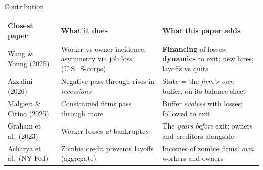 \documentclass[aspectratio=169,11pt]{beamer}
\newcommand{\hl}[1]{{\color{WarmAmber}\bfseries #1}}
\begin{document}
\begin{frame}{Contribution}
  \small
  \renewcommand{\arraystretch}{1.25}
  \begin{tabularx}{\textwidth}{>{\raggedright\arraybackslash}p{3.3cm} >{\raggedright\arraybackslash}X >{\raggedright\arraybackslash}X}
    \toprule
    \textbf{Closest paper} & \textbf{What it does} & \textbf{\color{SlateTeal}What this paper adds} \\
    \midrule
    Wang \& Young (2025) & Worker vs owner incidence; asymmetry via job loss (U.S.\ S-corps) & \hl{Financing} of losses; \hl{dynamics} to exit; new hires; layoffs vs quits \\
    Azzalini (2026) & Negative pass-through rises in \emph{recessions} & State = the \emph{firm's own} buffer, on its balance sheet \\
    Malgieri \& Citino (2025) & Constrained firms pass through more & Buffer \emph{evolves} with losses; followed to exit \\
    Graham et al.\ (2023) & Worker losses \emph{at} bankruptcy & The \emph{years before} exit; owners and creditors alongside \\
    Acharya et al.\ (NY Fed) & Zombie credit prevents layoffs (aggregate) & Incomes of zombie firms' \emph{own} workers and owners \\
    \bottomrule
  \end{tabularx}
\end{frame}
\end{document}
